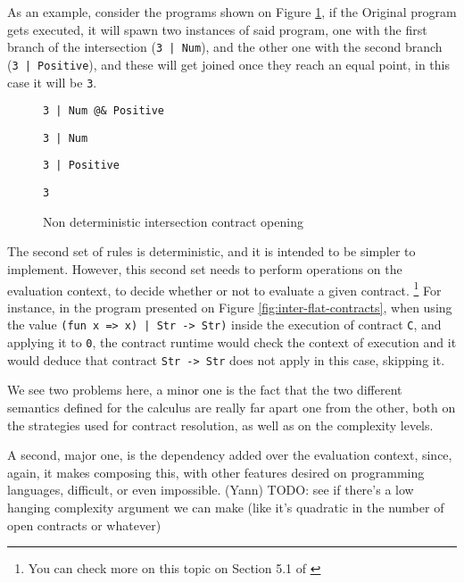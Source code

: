 \documentclass[sigplan,10pt,review,anonymous]{acmart}
\newcommand{\resolved}[2]{}
\newcommand{\nickel}[1]{\lstinline[language=nickel]{#1}}
\begin{document}
As an example, consider the programs shown on Figure
\ref{fig:kt-non-deterministic}, if the Original program
gets executed, it will spawn two instances of said program,
one with the first branch of the intersection (\nickel{3 | Num}),
and the other one with the second branch (\nickel{3 | Positive}),
and these will get joined once they reach an equal point, in this case
it will be \nickel{3}.

\begin{figure}[h]
\begin{lstlisting}[language=nickel, title=Original]
3 | Num @& Positive
\end{lstlisting}
\begin{lstlisting}[language=nickel, title=First Program]
3 | Num
\end{lstlisting}
\begin{lstlisting}[language=nickel, title=Second Program]
3 | Positive
\end{lstlisting}
\begin{lstlisting}[language=nickel, title=Joined Program]
3
\end{lstlisting}
\caption{Non deterministic intersection contract opening}
\label{fig:kt-non-deterministic}
\end{figure}

The second set of rules is deterministic, and it is intended
to be simpler to implement.
However, this second set needs to perform operations
on the evaluation context, to decide whether or not to evaluate
a given contract.
\footnote{You can check more on this topic on Section 5.1 of
\cite{KeilThiemannUnionIntersection}}
For instance, in the program presented on Figure \ref{fig:inter-flat-contracts},
when using the value \nickel{(fun x => x) | Str -> Str)}
inside the execution of contract \nickel{C}, and applying it to \nickel{0},
the contract runtime would check the context of execution and it would
deduce that contract \nickel{Str -> Str} does not apply in this case,
skipping it.

We see two problems here, a minor one is the fact that the two
different semantics defined for the calculus are really far apart
one from the other, both on the strategies used for contract resolution,
as well as on the complexity levels.
\resolved{(Yann) Is it really a
    problem per se? It is common thing to do (a nice declarative system
    for proofs and an algorithmic one for implementation, proved equivalent).
    Maybe the point is that the algorithmic system is way more complex than the
declarative one
(Teo) reworded}.
A second, major one,
is the dependency added over the evaluation context, since, again,
it makes composing this, with other features desired on programming languages,
difficult, or even impossible.
\resolved{(Yann) I think we need to substantiate this claim. If this
context dependency explains why CSE is invalid, maybe have a little example?
(Teo) I removed it, I don't think there's an example, mainly since
this context dependency is not part of the language. I do think it complicates
implementation of said feature}
\todo{(Yann) TODO: see if there's a low hanging complexity
    argument we can make (like it's quadratic in the number of open contracts or
whatever)}
\end{document}
